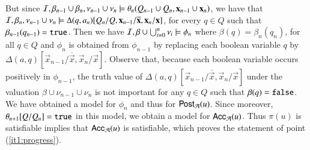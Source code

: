 \documentclass[10pt,conference,letterpaper,twocolumn]{IEEEtran}
\begin{document}
{  But since $\mathcal{I},\beta_{n-1} \cup \beta_n, \nu_{n-1} \cup \nu_n \models
  \theta_n(Q_{n-1}\cup Q_n, \mathbf x_{n-1} \cup \mathbf x_n)$, we have
  that $\mathcal{I},\beta_n,\nu_{n-1} \cup \nu_n \models
  \Delta(q,a_n)[Q_n/Q,\mathbf x_{n-1}/\overline{\mathbf x},\mathbf x_n/\mathbf x]$,
  for every $q \in Q$ such that $\beta_{n-1}(q_{n-1}) = \mathtt{true}$. Then
  we have $\mathcal{I},\beta\cup\bigcup_{i=0}^n\nu_i \models \phi_n$
  where $\beta(q) = \beta_n(q_n)$, for all $q \in Q$ and $\phi_n$ is
  obtained from $\phi_{n-1}$ by replacing each boolean variable $q$ by
  $\Delta(a,q)[\vec{x}_{n-1}/\overline{\vec{x}},\vec{x}_n/\vec{x}]$. Observe
  that, because each boolean variable occurs positively in
  $\phi_{n-1}$, the truth value of
  $\Delta(a,q)[\vec{x}_{n-1}/\overline{\vec{x}},\vec{x}_n/\vec{x}]$
  under the valuation $\beta\cup\nu_{n-1}\cup\nu_n$ is not important for
  any $q \in Q$ such that $\beta(q) = \mathtt{false}$. We have obtained a
  model for $\phi_n$ and thus for $\mathsf{Post}_{\mathcal{A}}(u)$. Since moreover,
  $\theta_{n+1}[Q/Q_n] = \mathtt{true}$ in this model, we obtain a model for
  $\mathsf{Acc}_{\mathcal{A}}(u)$. Thus $\pi(u)$ is satisfiable implies that
  $\mathsf{Acc}_{\mathcal{A}}(u)$ is satisfiable, which proves the statement of point
  (\ref{it1:progress}).

}
\end{document}
